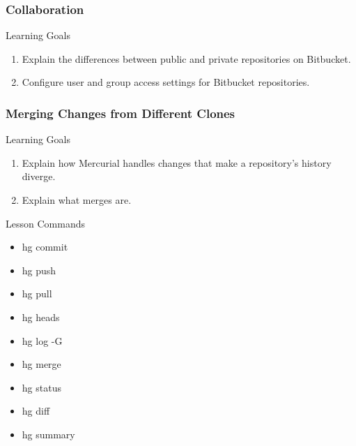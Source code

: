 \documentclass{beamer}
\begin{document}


\begin{frame}
  \frametitle{Collaboration}
  \begin{block}{Learning Goals}
    \begin{enumerate}
    \item Explain the differences between public and private repositories on Bitbucket.
    \item Configure user and group access settings for Bitbucket repositories.
    \end{enumerate}
  \end{block}
\end{frame}


\begin{frame}[label=merging]
  \frametitle{Merging Changes from Different Clones}
  \begin{block}{Learning Goals}
    \begin{enumerate}
    \item Explain how Mercurial handles changes that make a repository's history diverge.
    \item Explain what merges are.
    \end{enumerate}
  \end{block}
  \begin{block}{Lesson Commands}
    \begin{multicols}{2}
      \begin{itemize}
        \item hg commit
        \item hg push
        \item hg pull
        \item hg heads
        \item hg log -G
        \item hg merge
        \item hg status
        \item hg diff
        \item hg summary
      \end{itemize}
    \end{multicols}
  \end{block}
\end{frame}
\end{document}
